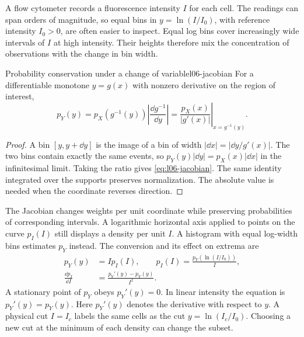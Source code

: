A flow cytometer records a fluorescence intensity $I$ for each cell. The readings can span orders of magnitude, so equal bins in $y=\ln(I/I_0)$, with reference intensity $I_0>0$, are often easier to inspect. Equal log bins cover increasingly wide intervals of $I$ at high intensity. Their heights therefore mix the concentration of observations with the change in bin width.

\begin{proposition}{Probability conservation under a change of variable}{l06-jacobian}
For a differentiable monotone $y=g(x)$ with nonzero derivative on the region of interest,
\begin{equation}
 \boxed{p_Y(y)=p_X(g^{-1}(y))\left|\frac{\dd g^{-1}}{\dd y}\right|
       =\left.\frac{p_X(x)}{|g'(x)|}\right|_{x=g^{-1}(y)}.}
 \label{eq:l06-jacobian}
\end{equation}
\end{proposition}

\begin{proof}
A bin $[y,y+\dd y]$ is the image of a bin of width $|\dd x|=|\dd y/g'(x)|$. The two bins contain exactly the same events, so $p_Y(y)|\dd y|=p_X(x)|\dd x|$ in the infinitesimal limit. Taking the ratio gives \eqref{eq:l06-jacobian}. The same identity integrated over the supports preserves normalization. The absolute value is needed when the coordinate reverses direction.
\end{proof}

The Jacobian changes weights per unit coordinate while preserving probabilities of corresponding intervals. A logarithmic horizontal axis applied to points on the curve $p_I(I)$ still displays a density per unit $I$. A histogram with equal log-width bins estimates $p_Y$ instead. The conversion and its effect on extrema are
\begin{align}
 p_Y(y)&=I p_I(I),\qquad
 p_I(I)=\frac{p_Y(\ln(I/I_0))}{I},
 \label{eq:l06-log-density}\\
 \frac{\dd p_I}{\dd I}&=\frac{p_Y'(y)-p_Y(y)}{I^2}.
 \label{eq:l06-log-modes}
\end{align}
A stationary point of $p_Y$ obeys $p_Y'(y)=0$. In linear intensity the equation is $p_Y'(y)=p_Y(y)$. Here $p_Y'(y)$ denotes the derivative with respect to $y$. A physical cut $I=I_c$ labels the same cells as the cut $y=\ln(I_c/I_0)$. Choosing a new cut at the minimum of each density can change the subset.

